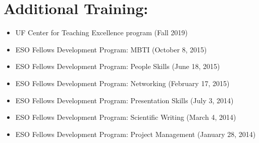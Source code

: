 \section*{Additional Training:}
\begin{itemize}
\itemsep-3pt
    \item UF Center for Teaching Excellence program (Fall 2019)
    \item ESO Fellows Development Program: MBTI (October 8, 2015)
    \item ESO Fellows Development Program: People Skills (June 18, 2015)
    \item ESO Fellows Development Program: Networking (February 17, 2015)
    \item ESO Fellows Development Program: Presentation Skills (July 3, 2014)
    \item ESO Fellows Development Program: Scientific Writing (March 4, 2014)
    \item ESO Fellows Development Program: Project Management (January 28, 2014)
\end{itemize}

